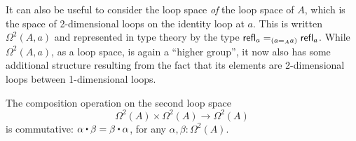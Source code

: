 It can also be useful to consider the loop space \emph{of} the loop space of $A$, which is the space of 2-dimensional loops on the identity loop at $a$. This is written $\Omega^2(A,a)$ and represented in type theory by the type $\id[({\id[A]{a}{a}})]{\refl{a}}{\refl{a}}$. While $\Omega^2(A,a)$, as a loop space, is again a ``higher group'', it now also has some additional structure resulting from the fact that its elements are 2-dimensional loops between 1-dimensional loops. 

\begin{thm}\label{thm:EckmannHilton}
The composition operation on the second loop space
%
\begin{equation*}
\Omega^2(A)\times \Omega^2(A)\to \Omega^2(A)
\end{equation*}
is commutative: $\alpha\ct\beta = \beta\ct\alpha$, for any $\alpha, \beta:\Omega^2(A)$.
%
\end{thm}

